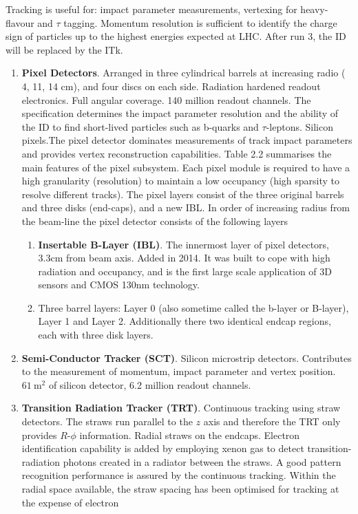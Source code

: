 Tracking is useful for: impact parameter measurements, vertexing for heavy-flavour and $\tau$ tagging. Momentum resolution is sufficient to identify the charge sign of particles up to the highest energies expected at LHC. After run 3, the ID will be replaced by the ITk.
%
\begin{enumerate}
    \item \textbf{Pixel Detectors}. Arranged in three cylindrical barrels at increasing radio ( 4, 11, 14 cm), and four discs on each side. Radiation hardened readout electronics. Full angular coverage. 140 million readout channels. The specification determines the impact parameter resolution and the ability of the ID to find short-lived particles such as b-quarks and $\tau$-leptons. Silicon pixels.The pixel detector dominates measurements of track impact parameters and provides vertex reconstruction capabilities. Table 2.2 summarises the main features of the pixel subsystem. Each pixel module is required to have a high granularity (resolution) to maintain a low occupancy (high sparsity to resolve different tracks). The pixel layers consist of the three original barrels and three disks (end-caps), and a new IBL. In order of increasing radius from the beam-line the pixel detector consists of the following layers
    \begin{enumerate}
        \item \textbf{Insertable B-Layer (IBL)}. The innermost layer of pixel detectors, 3.3cm from beam axis. Added in 2014. It was built to cope with high radiation and occupancy, and is the first large scale application of 3D sensors and CMOS 130nm technology.
        \item Three barrel layers: Layer 0 (also sometime called the b-layer or B-layer), Layer 1 and Layer 2. Additionally there two identical endcap regions, each with three disk layers.
    \end{enumerate}
    \item \textbf{Semi-Conductor Tracker (SCT)}. Silicon microstrip detectors. Contributes to the measurement of momentum, impact parameter and vertex position. $61 ~\textrm{m}^2$ of silicon detector, 6.2 million readout channels.
    \item \textbf{Transition Radiation Tracker (TRT)}. Continuous tracking using straw detectors. The straws run parallel to the $z$ axis and therefore the TRT only provides $R$\nobreakdash-$\phi$ information. Radial straws on the endcaps. Electron identification capability is added by employing xenon gas to detect transition-radiation photons created in a radiator between the straws. A good pattern recognition performance is assured by the continuous tracking. Within the radial space available, the straw spacing has been optimised for tracking at the expense of electron

\end{enumerate}
